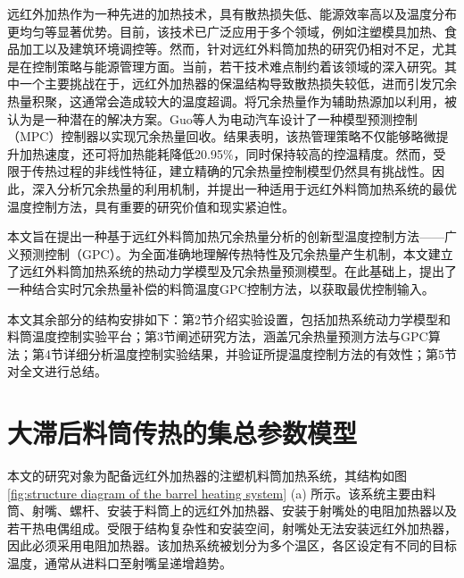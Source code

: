 远红外加热作为一种先进的加热技术，具有散热损失低、能源效率高\cite{Camacho_2007_model}以及温度分布更均匀\cite{Aboud_2019_comprehensive}等显著优势。目前，该技术已广泛应用于多个领域，例如注塑模具加热\cite{Bui_2015_development}、食品加工\cite{Brown_2016_energy,Chang_2006_experimental}以及建筑环境调控\cite{Chang_2006_simulation}等。然而，针对远红外料筒加热的研究仍相对不足，尤其是在控制策略与能源管理方面。当前，若干技术难点制约着该领域的深入研究。其中一个主要挑战在于，远红外加热器的保温结构导致散热损失较低，进而引发冗余热量积聚，这通常会造成较大的温度超调。将冗余热量作为辅助热源加以利用，被认为是一种潜在的解决方案\cite{Chen_2018_online,Chen_2019_monitoring}。Guo等人\cite{Guo_2023_integrated}为电动汽车设计了一种模型预测控制（MPC）控制器以实现冗余热量回收。结果表明，该热管理策略不仅能够略微提升加热速度，还可将加热能耗降低20.95\%，同时保持较高的控温精度。然而，受限于传热过程的非线性特征\cite{Gao_2017_development}，建立精确的冗余热量控制模型仍然具有挑战性。因此，深入分析冗余热量的利用机制，并提出一种适用于远红外料筒加热系统的最优温度控制方法，具有重要的研究价值和现实紧迫性。\par

本文旨在提出一种基于远红外料筒加热冗余热量分析的创新型温度控制方法——广义预测控制（GPC）。为全面准确地理解传热特性及冗余热量产生机制，本文建立了远红外料筒加热系统的热动力学模型及冗余热量预测模型。在此基础上，提出了一种结合实时冗余热量补偿的料筒温度GPC控制方法，以获取最优控制输入。\par

本文其余部分的结构安排如下：第2节介绍实验设置，包括加热系统动力学模型和料筒温度控制实验平台；第3节阐述研究方法，涵盖冗余热量预测方法与GPC算法；第4节详细分析温度控制实验结果，并验证所提温度控制方法的有效性；第5节对全文进行总结。\par

\section{大滞后料筒传热的集总参数模型}

本文的研究对象为配备远红外加热器的注塑机料筒加热系统，其结构如图 \ref{fig:structure diagram of the barrel heating system} (a) 所示。该系统主要由料筒、射嘴、螺杆、安装于料筒上的远红外加热器、安装于射嘴处的电阻加热器以及若干热电偶组成。受限于结构复杂性和安装空间，射嘴处无法安装远红外加热器，因此必须采用电阻加热器。该加热系统被划分为多个温区，各区设定有不同的目标温度，通常从进料口至射嘴呈递增趋势。\par

